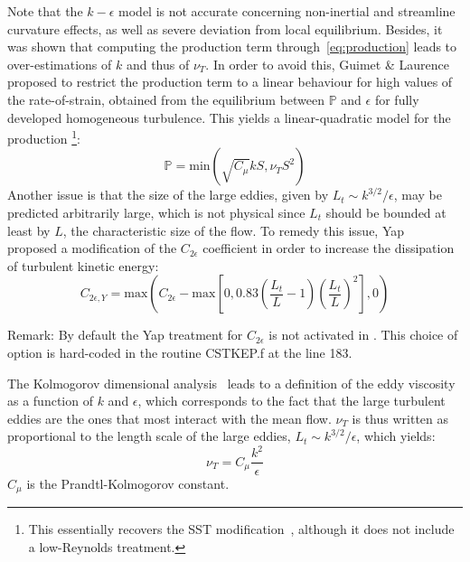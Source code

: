 Note that the $k-\epsilon$ model is not accurate concerning non-inertial and streamline curvature effects, as well as severe deviation from local equilibrium.
Besides, it was shown that computing the production term through~\eqref{eq:production} leads to over-estimations of $k$ and thus of $\nu_T$.
In order to avoid this, Guimet \& Laurence~\cite{Guimet2002} proposed to restrict the production term to a linear behaviour for high values of the rate-of-strain,
obtained from the equilibrium between $\mathbb P$ and $\epsilon$ for fully developed homogeneous turbulence.
This yields a linear-quadratic model for the production%
\footnote{This essentially recovers the SST modification~\cite{Menter1994}, although it does not include a low-Reynolds treatment.}:
\begin{equation}\label{eq:P}
\mathbb P = \text{min}\left(\sqrt{C_\mu} k S, \nu_T S^2 \right)
\end{equation}
Another issue is that the size of the large eddies, given by $L_t \sim k^{3/2}/\epsilon$, may be predicted arbitrarily large, which is not physical since $L_t$ should
be bounded at least by $L$, the characteristic size of the flow.
To remedy this issue, Yap~\cite{Yap1987} proposed a modification of the $C_{2\epsilon}$ coefficient in order to increase the dissipation of turbulent kinetic energy:
\begin{equation}\label{eq:Cepsilon2_Yap}
  C_{2\epsilon,Y} = \text{max}\left(C_{2\epsilon} - \text{max}\left[ 0, 0.83\left(\dfrac{L_t}{L}-1\right)\left(\dfrac{L_t}{L}\right)^2 \right],0\right)
\end{equation}

\begin{CommentBlock}{Remark:}
By default the Yap treatment for $C_{2\epsilon}$ is not activated in .
This choice of option is hard-coded in the routine CSTKEP.f at the line 183.
\end{CommentBlock}

The Kolmogorov dimensional analysis~\cite{Kolmogorov1991} leads to a definition of the eddy viscosity as a function of $k$ and $\epsilon$,
which corresponds to the fact that the large turbulent eddies are the ones that most interact with the mean flow.
$\nu_T$ is thus written as proportional to the length scale of the large eddies, $L_t \sim k^{3/2}/\epsilon$, which yields:
\begin{equation}\label{eq:nut}
\nu_T = C_\mu \dfrac{k^2}{\epsilon}
\end{equation}
$C_\mu$ is the Prandtl-Kolmogorov constant.\\

